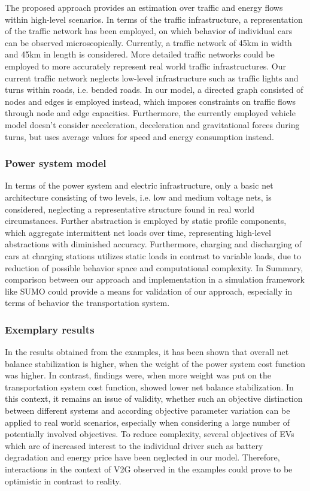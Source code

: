The proposed approach provides an estimation over traffic and energy flows within high-level scenarios. In terms of the traffic infrastructure, a representation of the traffic network has been employed, on which behavior of individual cars can be observed microscopically. Currently, a traffic network of 45km in width and 45km in length is considered. More detailed traffic networks could be employed to more accurately represent real world traffic infrastructures. Our current traffic network neglects low-level infrastructure such as traffic lights and turns within roads, i.e. bended roads. In our model, a directed graph consisted of nodes and edges is employed instead, which imposes constraints on traffic flows through node and edge capacities. Furthermore, the currently employed vehicle model doesn't consider acceleration, deceleration and gravitational forces during turns, but uses average values for speed and energy consumption instead.

\subsubsection{Power system model}

In terms of the power system and electric infrastructure, only a basic net architecture consisting of two levels, i.e. low and medium voltage nets, is considered, neglecting a representative structure found in real world circumstances. Further abstraction is employed by static profile components, which aggregate intermittent net loads over time, representing high-level abstractions with diminished accuracy. Furthermore, charging and discharging of cars at charging stations utilizes static loads in contrast to variable loads, due to reduction of possible behavior space and computational complexity. In Summary, comparison between our approach and implementation in a simulation framework like SUMO could provide a means for validation of our approach, especially in terms of behavior the transportation system.

\subsubsection{Exemplary results}

In the results obtained from the examples, it has been shown that overall net balance stabilization is higher, when the weight of the power system cost function was higher. In contrast, findings were, when more weight was put on the transportation system cost function, showed lower net balance stabilization. In this context, it remains an issue of validity, whether such an objective distinction between different systems and according objective parameter variation can be applied to real world scenarios, especially when considering a large number of potentially involved objectives. To reduce complexity, several objectives of EVs which are of increased interest to the individual driver such as battery degradation and energy price have been neglected in our model. Therefore, interactions in the context of V2G observed in the examples could prove to be optimistic in contrast to reality. 

